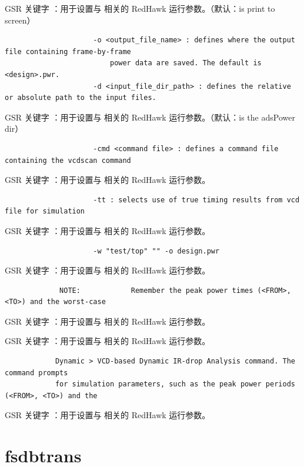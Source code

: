 GSR 关键字 ：用于设置与  相关的 RedHawk 运行参数。（默认：is print to screen）

\begin{lstlisting}
                     -o <output_file_name> : defines where the output file containing frame-by-frame
                         power data are saved. The default is <design>.pwr.
                     -d <input_file_dir_path> : defines the relative or absolute path to the input files.
\end{lstlisting}

GSR 关键字 ：用于设置与  相关的 RedHawk 运行参数。（默认：is the adsPower dir）

\begin{lstlisting}
                     -cmd <command file> : defines a command file containing the vcdscan command
\end{lstlisting}

GSR 关键字 ：用于设置与  相关的 RedHawk 运行参数。

\begin{lstlisting}
                     -tt : selects use of true timing results from vcd file for simulation
\end{lstlisting}

GSR 关键字 ：用于设置与  相关的 RedHawk 运行参数。

\begin{lstlisting}
                     -w "test/top" "" -o design.pwr
\end{lstlisting}

GSR 关键字 ：用于设置与  相关的 RedHawk 运行参数。

\begin{lstlisting}
             NOTE:            Remember the peak power times (<FROM>, <TO>) and the worst-case
\end{lstlisting}

GSR 关键字 ：用于设置与  相关的 RedHawk 运行参数。

GSR 关键字 ：用于设置与  相关的 RedHawk 运行参数。

\begin{lstlisting}
            Dynamic > VCD-based Dynamic IR-drop Analysis command. The command prompts
            for simulation parameters, such as the peak power periods (<FROM>, <TO>) and the
\end{lstlisting}

GSR 关键字 ：用于设置与  相关的 RedHawk 运行参数。

\section{fsdbtrans}
